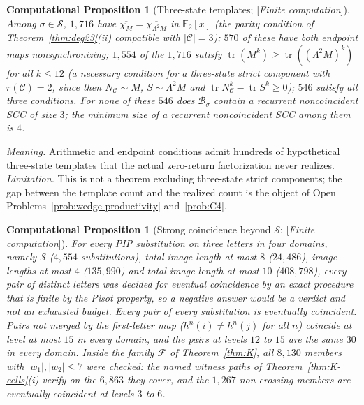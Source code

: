 \documentclass[11pt]{amsart}
\theoremstyle{plain}
\newtheorem{computation}[theorem]{Computational Proposition}
\theoremstyle{definition}
\theoremstyle{remark}
\newcommand{\F}{\mathbb{F}}
\newcommand{\B}{\mathcal{B}}
\newcommand{\cC}{\mathcal{C}}
\newcommand{\Status}[1]{\textup{[\textit{#1}]}}
\begin{document}
\begin{computation}[Three-state templates; \Status{Finite computation}]\label{comp:threestate}
Among $\sigma\in\mathcal S$, $1{,}716$ have $\overline{\chi_M}=\overline{\chi_{\Lambda^2M}}$ in $\F_2[x]$ (the parity condition of Theorem~\ref{thm:deg23}(ii) compatible with $|\cC|=3$); $570$ of these have both endpoint maps nonsynchronizing; $1{,}554$ of the $1{,}716$ satisfy $\operatorname{tr}(M^k)\ge\operatorname{tr}((\Lambda^2M)^k)$ for all $k\le12$ (a necessary condition for a three-state strict component with $r(\cC)=2$, since then $N_\cC\sim M$, $S\sim\Lambda^2M$ and $\operatorname{tr}N_\cC^k-\operatorname{tr}S^k\ge0$); $546$ satisfy all three conditions. For none of these $546$ does $\B_\sigma$ contain a recurrent noncoincident SCC of size $3$; the minimum size of a recurrent noncoincident SCC among them is $4$.
\end{computation}

\emph{Meaning.} Arithmetic and endpoint conditions admit hundreds of hypothetical three-state templates that the actual zero-return factorization never realizes. \emph{Limitation.} This is not a theorem excluding three-state strict components; the gap between the template count and the realized count is the object of Open Problems~\ref{prob:wedge-productivity} and~\ref{prob:C4}.

\begin{computation}[Strong coincidence beyond $\mathcal S$; \Status{Finite computation}]\label{comp:strong-coincidence}
For every PIP substitution on three letters in four domains, namely $\mathcal S$ ($4{,}554$ substitutions), total image length at most $8$ ($24{,}486$), image lengths at most $4$ ($135{,}990$) and total image length at most $10$ ($408{,}798$), every pair of distinct letters was decided for eventual coincidence by an exact procedure that is finite by the Pisot property, so a negative answer would be a verdict and not an exhausted budget. Every pair of every substitution is eventually coincident. Pairs not merged by the first-letter map ($h^n(i)\ne h^n(j)$ for all $n$) coincide at level at most $15$ in every domain, and the pairs at levels $12$ to $15$ are the same $30$ in every domain. Inside the family $\mathcal F$ of Theorem~\ref{thm:K}, all $8{,}130$ members with $|w_1|,|w_2|\le7$ were checked: the named witness paths of Theorem~\ref{thm:K-cells}(i) verify on the $6{,}863$ they cover, and the $1{,}267$ non-crossing members are eventually coincident at levels $3$ to $6$.
\end{computation}
\end{document}
